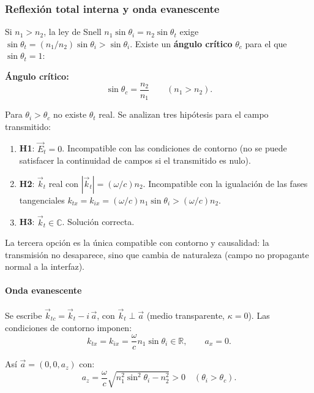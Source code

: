 \documentclass[12pt, a4paper]{article}
\theoremstyle{plain}
\theoremstyle{definition}
\theoremstyle{remark}
\newcommand{\R}{\mathbb{R}}
\newcommand{\C}{\mathbb{C}}
\newcommand{\ve}[1]{\vec{#1}}
\begin{document}
\subsubsection{Reflexión total interna y onda evanescente}

Si $n_1 > n_2$, la ley de Snell $n_1\sin\theta_i = n_2\sin\theta_t$ exige
$\sin\theta_t = (n_1/n_2)\sin\theta_i > \sin\theta_i$.
Existe un \textbf{ángulo crítico} $\theta_c$ para el que $\sin\theta_t = 1$:

\begin{mdframed}[style=resultado]
\textbf{Ángulo crítico:}
\begin{equation}
  \sin\theta_c = \frac{n_2}{n_1} \qquad (n_1 > n_2).
  \label{eq:angulo_critico}
\end{equation}
\end{mdframed}

Para $\theta_i > \theta_c$ no existe $\theta_t$ real. Se analizan tres
hipótesis para el campo transmitido:

\begin{enumerate}
  \item \textbf{H1}: $\ve{E}_t = 0$. Incompatible con las condiciones de
        contorno (no se puede satisfacer la continuidad de campos si el
        transmitido es nulo).
  \item \textbf{H2}: $\ve{k}_t$ real con $|\ve{k}_t| = (\omega/c)n_2$.
        Incompatible con la igualación de las fases tangenciales
        $k_{tx} = k_{ix} = (\omega/c)n_1\sin\theta_i > (\omega/c)n_2$.
  \item \textbf{H3}: $\ve{k}_t \in \C$. Solución correcta.
\end{enumerate}

La tercera opción es la única compatible con contorno y causalidad: la
transmisión no desaparece, sino que cambia de naturaleza (campo no propagante
normal a la interfaz).

\paragraph{Onda evanescente}

Se escribe $\ve{k}_{tc} = \ve{k}_t - i\,\ve{a}$, con $\ve{k}_t \perp \ve{a}$
(medio transparente, $\kappa = 0$). Las condiciones de contorno imponen:
\[
  k_{tx} = k_{ix} = \frac{\omega}{c}n_1\sin\theta_i \in \R, \qquad
  a_x = 0.
\]

Así $\ve{a} = (0, 0, a_z)$ con:
\[
  a_z = \frac{\omega}{c}\sqrt{n_1^2\sin^2\theta_i - n_2^2} > 0
  \quad (\theta_i > \theta_c).
\]
\end{document}
